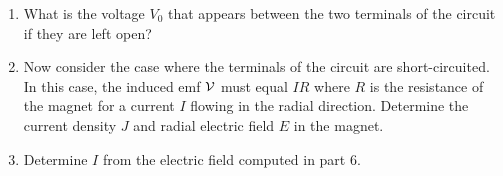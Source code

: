 \documentclass[../../header.tex]{subfiles}
\begin{document}
\begin{enumerate}
\item What is the voltage $V_0$ that appears between the two terminals of the circuit if they are left open?


\item Now consider the case where the terminals of the circuit are short-circuited. In this case, the induced emf ${\cal V}$ must equal $IR$ where $R$ is the resistance of the magnet for a current $I$ flowing in the radial direction. Determine the current density $J$ and radial electric field $E$ in the magnet. 


\item Determine $I$ from the electric field computed in part 6. %


\end{enumerate}
\end{document}
